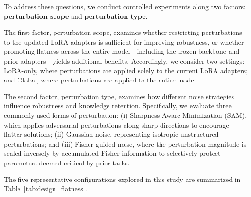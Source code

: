 \documentclass[letterpaper]{article} %
\begin{document}



To address these questions, we conduct controlled experiments along two factors: \textbf{perturbation scope} and \textbf{perturbation type}.

The first factor, perturbation scope, examines whether restricting perturbations to the updated LoRA adapters is sufficient for improving robustness, or whether promoting flatness across the entire model—including the frozen backbone and prior adapters—yields additional benefits. Accordingly, we consider two settings: LoRA-only, where perturbations are applied solely to the current LoRA adapters; and Global, where perturbations are applied to the entire model.

The second factor, perturbation type, examines how different noise strategies influence robustness and knowledge retention. Specifically, we evaluate three commonly used forms of perturbation: (i) Sharpness-Aware Minimization (SAM), which applies adversarial perturbations along sharp directions to encourage flatter solutions; (ii) Gaussian noise, representing isotropic unstructured perturbations; and (iii) Fisher-guided noise, where the perturbation magnitude is scaled inversely by accumulated Fisher information to selectively protect parameters deemed critical by prior tasks.

The five representative configurations explored in this study are summarized in Table~\ref{tab:design_flatness}.




\end{document}
